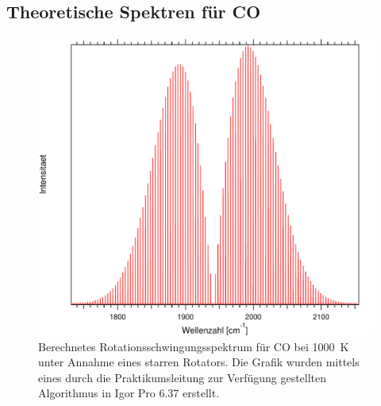 \subsection*{Theoretische Spektren für CO}
\begin{figure}[H]
\centering	
	\begin{minipage}{0.8\linewidth}
	\includegraphics[width=\linewidth]{Bilder/1000CO.pdf}
	\caption{Berechnetes Rotationsschwingungsspektrum für CO bei 1000~K unter Annahme eines starren Rotators. Die Grafik wurden mittels eines durch die Praktikumsleitung zur Verfügung gestellten Algorithmus in Igor Pro 6.37 erstellt.}
	\label{Rot:1000CO}
	\end{minipage}

	
	
	
	
\end{figure}

